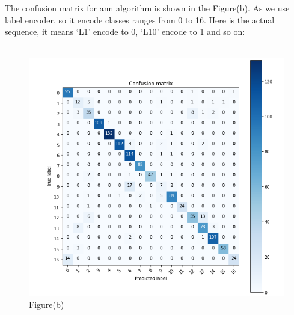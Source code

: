 The confusion matrix for ann algorithm is shown in the Figure(b). As we use label encoder, so it encode classes ranges from 0 to 16. Here is the actual sequence, it means ‘L1’ encode to 0, ‘L10’ encode to 1 and so on:
\\\\
\begin{figure}[h]

  		\centering
    		\includegraphics[scale=0.7]{./Figures/cmann}
\\Figure(b)
 		\end{figure}


